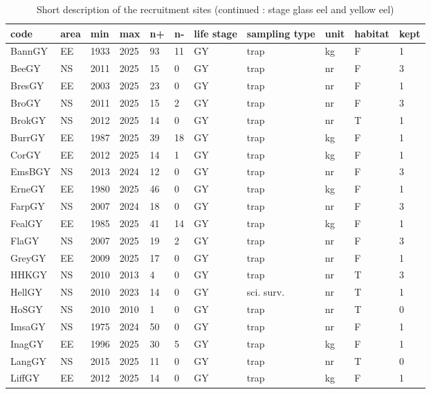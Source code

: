 \begin{table}[htbp]
\centering
\caption{Short description of the recruitment sites (continued : stage glass eel and yellow eel)} 
\label{statseriesGY}
\begin{tabular}{p{1cm}p{1cm}p{1cm}p{1cm}p{0.8cm}p{0.8cm}p{1cm}p{2cm}p{2cm}p{1cm}p{1cm}}
  \hline
code & area & min & max & n+ & n- & life stage & sampling type & unit & habitat & kept \\ 
  \hline
BannGY & EE & 1933 & 2025 & 93 & 11 & GY & trap & kg & F & 1 \\ 
  BeeGY & NS & 2011 & 2025 & 15 & 0 & GY & trap & nr & F & 3 \\ 
  BresGY & EE & 2003 & 2025 & 23 & 0 & GY & trap & nr & F & 1 \\ 
  BroGY & NS & 2011 & 2025 & 15 & 2 & GY & trap & nr & F & 3 \\ 
  BrokGY & NS & 2012 & 2025 & 14 & 0 & GY & trap & nr & T & 1 \\ 
  BurrGY & EE & 1987 & 2025 & 39 & 18 & GY & trap & kg & F & 1 \\ 
  CorGY & EE & 2012 & 2025 & 14 & 1 & GY & trap & kg & F & 1 \\ 
  EmsBGY & NS & 2013 & 2024 & 12 & 0 & GY & trap & nr & F & 3 \\ 
  ErneGY & EE & 1980 & 2025 & 46 & 0 & GY & trap & kg & F & 1 \\ 
  FarpGY & NS & 2007 & 2024 & 18 & 0 & GY & trap & nr & F & 3 \\ 
  FealGY & EE & 1985 & 2025 & 41 & 14 & GY & trap & kg & F & 1 \\ 
  FlaGY & NS & 2007 & 2025 & 19 & 2 & GY & trap & nr & F & 3 \\ 
  GreyGY & EE & 2009 & 2025 & 17 & 0 & GY & trap & nr & F & 1 \\ 
  HHKGY & NS & 2010 & 2013 & 4 & 0 & GY & trap & nr & T & 3 \\ 
  HellGY & NS & 2010 & 2023 & 14 & 0 & GY & sci. surv. & nr & T & 1 \\ 
  HoSGY & NS & 2010 & 2010 & 1 & 0 & GY & trap & nr & T & 0 \\ 
  ImsaGY & NS & 1975 & 2024 & 50 & 0 & GY & trap & nr & F & 1 \\ 
  InagGY & EE & 1996 & 2025 & 30 & 5 & GY & trap & kg & F & 1 \\ 
  LangGY & NS & 2015 & 2025 & 11 & 0 & GY & trap & nr & T & 0 \\ 
  LiffGY & EE & 2012 & 2025 & 14 & 0 & GY & trap & kg & F & 1 \\ 

\end{tabular}
\end{table}
